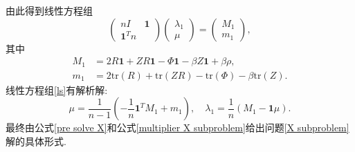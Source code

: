 \documentclass[UTF8,10.5pt,a4paper]{ctexart}
\theoremstyle{definition}
\theoremstyle{definition}
\newcommand{\trace}{\mathrm{tr}}
\newcommand{\one}{\mathbf{1}}
\begin{document}
由此得到线性方程组
\begin{equation}
	\begin{pmatrix}
		nI & \one\\\one^T n
	\end{pmatrix}\begin{pmatrix}
		\lambda_1\\\mu
	\end{pmatrix}=\begin{pmatrix}
		M_1\\m_1
	\end{pmatrix},
	\label{ls}
\end{equation}
其中
$$\begin{aligned}
	M_1&=2R\one+ZR\one-\Phi \one-\beta Z\one+\beta\rho,\\
	m_1&=2\trace(R)+\trace(ZR)-\trace(\Phi)-\beta\trace(Z).
\end{aligned}$$
线性方程组\eqref{ls}有解析解:
\begin{equation}
	\mu=\frac{1}{n-1}\left(-\frac{1}{n}\one^TM_1+m_1\right),\quad\lambda_1=\frac{1}{n}(M_1-\one\mu).
	\label{multiplier X subproblem}
\end{equation}
最终由公式\eqref{pre solve X}和公式\eqref{multiplier X subproblem}给出问题\eqref{X subproblem}解的具体形式. 
\end{document}

